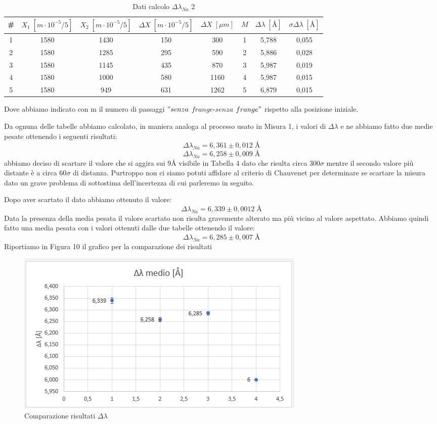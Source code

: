 \documentclass{article}
\begin{document}
\begin{table}[h!]
\centering
\begin{tabular}{ | c | c | c | c | c | c | c | c |}
\hline
\# & $X_1 \; [m \cdot 10^{-5}/5]$ & $X_2 \; [m \cdot 10^{-5}/5]$ & $\Delta X \; [m \cdot 10^{-5}/5]$ & $\Delta X \; [\mu m]$ & $M$ & $\Delta\lambda \; [\textrm{Å}]$ & $\sigma\Delta\lambda \; [\textrm{Å}]$\\
\hline
   1 & 1580 & 1430 & 150 & 300 & 1 & 5,788 & 0,055\\
   2 & 1580 & 1285 & 295 & 590 & 2 & 5,886 & 0,028\\
   3 & 1580 & 1145 & 435 & 870 & 3 & 5,987 & 0,019\\
   4 & 1580 & 1000 & 580 & 1160 & 4 & 5,987 & 0,015\\
   5 & 1580 & 949 & 631 & 1262 & 5 & 6,879 & 0,015\\
\hline
\end{tabular}
\caption{Dati calcolo $\Delta\lambda_{Na}$ 2}
\label{table:5}
\end{table}


\pagebreak
Dove abbiamo indicato con m il numero di passaggi $"senza$ $frange$-$senza$ $frange"$ rispetto alla posizione iniziale.

Da ognuna delle tabelle abbiamo calcolato, in maniera analoga al processo usato in Misura 1, i valori di $\Delta\lambda$ e ne abbiamo fatto due medie pesate ottenendo i seguenti risultati:
\[ \Delta \lambda_{Na} = 6,361 \pm 0,012 \; \textrm{Å} \]
\[ \Delta \lambda_{Na} = 6,258 \pm 0,009 \; \textrm{Å} \]
abbiamo deciso di scartare il valore che si aggira sui $9 \textrm{Å}$ visibile in Tabella 4 dato che risulta circa 300$\sigma$ mentre il secondo valore più distante è a circa 60$\sigma$ di distanza. Purtroppo non ci siamo potuti affidare al criterio di Chauvenet per determinare se scartare la misura dato un grave problema di sottostima dell'incertezza di cui parleremo in seguito.

Dopo aver scartato il dato abbiamo ottenuto il valore:
\[ \Delta \lambda_{Na} = 6,339 \pm 0,0012 \; \textrm{Å} \]
Data la presenza della media pesata il valore scartato non risulta gravemente alterato ma più vicino al valore aspettato.
Abbiamo quindi fatto una media pesata con i valori ottenuti dalle due tabelle ottenendo il valore:
\[ \Delta \lambda_{Na} = 6,285 \pm 0,007 \; \textrm{Å} \]
Riportiamo in Figura 10 il grafico per la comparazione dei risultati


\begin{figure}[h!]
  \centering
  \includegraphics[width=0.6\linewidth]{IM grafico risultati delta lambda}
  \caption{Comparazione risultati $\Delta\lambda$}
\end{figure}
\end{document}

